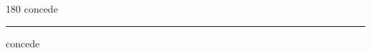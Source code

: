 
\begin{frame}
\begin{center}
\begin{turn}{180}
{\fontsize{2.5cm}{1em}\selectfont concede}
\end{turn}
\vspace{1em}\par  
\hrule
\vspace{1em}\par  
{\fontsize{2.5cm}{1em}\selectfont concede}
\end{center}
\end{frame}
